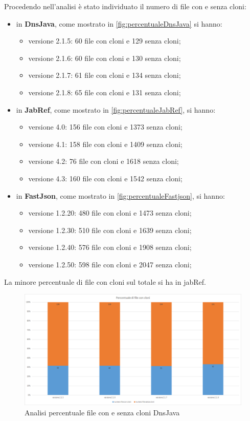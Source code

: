Procedendo nell'analisi è stato individuato il numero di file con e senza cloni:
\begin{itemize}
	\item in \textbf{DnsJava}, come mostrato in \autoref{fig:percentualeDnsJava} si hanno:
	\begin{itemize}
		\item versione 2.1.5: 60 file con cloni e 129 senza cloni;
		\item versione 2.1.6: 60 file con cloni e 130 senza cloni;
		\item versione 2.1.7: 61 file con cloni e 134 senza cloni;
		\item versione 2.1.8: 65 file con cloni e 131 senza cloni;
	\end{itemize}
	\item in \textbf{JabRef}, come mostrato in \autoref{fig:percentualeJabRef}, si hanno:
	\begin{itemize}
		\item versione 4.0: 156 file con cloni e 1373 senza cloni;
		\item versione 4.1: 158 file con cloni e 1409 senza cloni;
		\item versione 4.2: 76 file con cloni e 1618 senza cloni;
		\item versione 4.3: 160 file con cloni e 1542 senza cloni;
	\end{itemize}
		\item in \textbf{FastJson}, come mostrato in \autoref{fig:percentualeFastjson}, si hanno:
	\begin{itemize}
		\item versione 1.2.20: 480 file con cloni e 1473 senza cloni;
		\item versione 1.2.30: 510 file con cloni e 1639 senza cloni;
		\item versione 1.2.40: 576 file con cloni e 1908 senza cloni;
		\item versione 1.2.50: 598 file con cloni e 2047 senza cloni;
	\end{itemize}
\end{itemize}
La minore percentuale di file con cloni sul totale si ha in jabRef.
\begin{figure}[h]
	\centering
	\includegraphics[scale=0.3, trim = 0cm 0cm 0cm 0cm, clip=true]{Grafici_dnsJava/PercentualeFileCloni.png}
	\caption{Analisi percentuale file con e senza cloni DnsJava}
	\label{fig:percentualeDnsJava}	
\end{figure}
